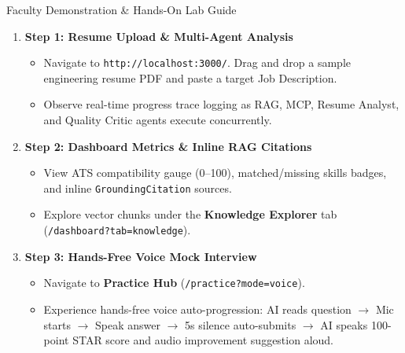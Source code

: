 \documentclass[aspectratio=169, 10pt]{beamer}
\begin{document}
\begin{frame}{Faculty Demonstration \& Hands-On Lab Guide}
  \begin{enumerate}
    \item \textbf{Step 1: Resume Upload \& Multi-Agent Analysis}
      \begin{itemize}
        \item Navigate to \texttt{http://localhost:3000/}. Drag and drop a sample engineering resume PDF and paste a target Job Description.
        \item Observe real-time progress trace logging as RAG, MCP, Resume Analyst, and Quality Critic agents execute concurrently.
      \end{itemize}
    
    \vspace{0.2cm}
    \item \textbf{Step 2: Dashboard Metrics \& Inline RAG Citations}
      \begin{itemize}
        \item View ATS compatibility gauge (0--100), matched/missing skills badges, and inline \texttt{GroundingCitation} sources.
        \item Explore vector chunks under the \textbf{Knowledge Explorer} tab (\texttt{/dashboard?tab=knowledge}).
      \end{itemize}
    
    \vspace{0.2cm}
    \item \textbf{Step 3: Hands-Free Voice Mock Interview}
      \begin{itemize}
        \item Navigate to \textbf{Practice Hub} (\texttt{/practice?mode=voice}).
        \item Experience hands-free voice auto-progression: AI reads question $\rightarrow$ Mic starts $\rightarrow$ Speak answer $\rightarrow$ 5s silence auto-submits $\rightarrow$ AI speaks 100-point STAR score and audio improvement suggestion aloud.
      \end{itemize}
  \end{enumerate}
\end{frame}
\end{document}
